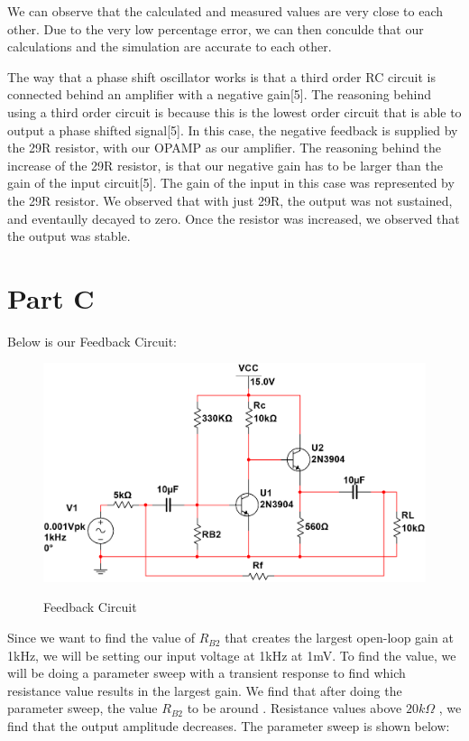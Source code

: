 \documentclass[12pt]{article}
\begin{document}
We can observe that the calculated and measured values are very close to each other. Due to the very low percentage error, 
we can then conculde that our calculations and the simulation are accurate to each other.

The way that a phase shift oscillator works is that a third order RC circuit is connected behind an amplifier with a negative gain[5]. The reasoning behind using 
a third order circuit is because this is the lowest order circuit that is able to output a phase shifted signal[5]. In this case, the negative feedback
is supplied by the 29R resistor, with our OPAMP as our amplifier. The reasoning behind the increase of the 29R resistor, is that our negative gain
has to be larger than the gain of the input circuit[5]. The gain of the input in this case was represented by the 29R resistor.
We observed that with just 29R, the output was not sustained, and eventaully decayed to zero. Once the resistor was increased,
we observed that the output was stable. 

\section{Part C}
Below is our Feedback Circuit:
\begin{figure}[H]
    \centering
    \includegraphics[height=0.35\textwidth]{Images/partCcircuit.png}\\
    \caption{Feedback Circuit}
    \label{fig:feedbackcircuit}
\end{figure}

Since we want to find the value of $R_{B2}$ that creates the largest open-loop gain at 1kHz, we will be setting our
input voltage at 1kHz at 1mV. To find the value, we will be doing a parameter sweep with a transient response to 
find which resistance value results in the largest gain. We find that after doing the parameter sweep,
the value $R_{B2}$ to be around . Resistance values above $20k\Omega$
, we find that the output amplitude decreases. The parameter sweep is shown below:
\end{document}
